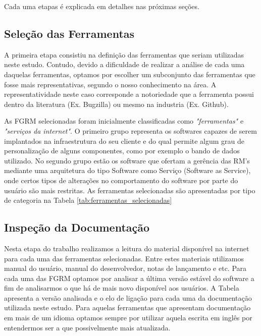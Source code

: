 Cada uma etapas é explicada em detalhes nas próximas seções. 

\subsection{Seleção das Ferramentas}
\label{ssub:Seleção das Ferramentas}

A primeira etapa consistiu na definição das ferramentas que seriam utilizadas
neste estudo. Contudo, devido a dificuldade de realizar a análise de cada uma daquelas
ferramentas, optamos por escolher um subconjunto das ferramentas que fosse mais
representativas, segundo o nosso conhecimento na área. A representatividade
neste caso corresponde a notoriedade que a ferramenta possui dentro da
literatura (Ex. Bugzilla) ou mesmo na industria (Ex. Github).

As FGRM selecionadas foram inicialmente classificadas como
\textit{"ferramentas"} e \textit{"serviços da internet"}. O primeiro grupo
representa os softwares capazes de serem implantados na infraestrutura do seu
cliente e do qual permite algum grau de personalização de alguns componentes,
como por exemplo o bando de dados utilizado. No segundo grupo estão os software
que ofertam a gerência das RM's mediante uma arquitetura do tipo Software como
Serviço (Software as Service), onde certos tipos de alterações no comportamento
do software por parte do usuário são mais restritas. As ferramentas selecionadas
são apresentadas por tipo de categoria na Tabela
\ref{tab:ferramentas_selecionadas} 

\subsection{Inspeção da Documentação}
\label{ssub:Inspeção da Documentação}

Nesta etapa do trabalho realizamos a leitura do material disponível na internet
para cada uma das ferramentas selecionadas. Entre estes materiais utilizamos
manual do usuário, manual do desenvolvedor, notas de lançamento e etc. Para cada
uma das FGRM optamos por analisar a última versão estável do software a fim de
analisarmos o que há de mais novo disponível aos usuários. A Tabela apresenta a
versão analisada e o elo de ligação para cada uma da documentação utilizada
neste estudo. Para aquelas ferramentas que apresentam documentação em mais de um
idioma optamos sempre por utilizar aquela escrita em inglês por entendermos ser
a que possivelmente mais atualizada.

